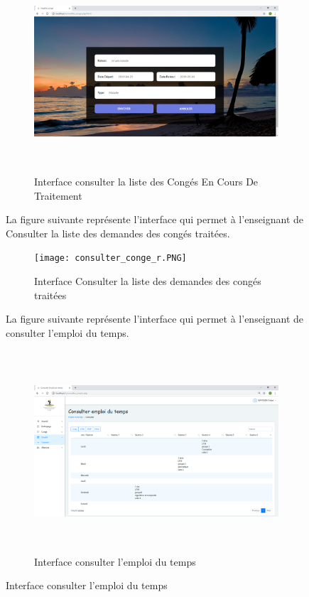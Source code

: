 \documentclass[12 pt]{report}
\begin{document}
\begin{figure}[h]
\begin{center}
\begin{figure}[h]
 \begin{center}
\includegraphics[width= 18 cm ,height=  7.5cm]{modifier_conge.PNG}
\caption{Interface consulter la liste des Congés En Cours De Traitement}

\end{center}
\end{figure}
\newpage
La figure suivante représente l'interface qui permet à l'enseignant de Consulter la liste des demandes des congés traitées.

\begin{figure}[h]
 \begin{center}
\texttt{[image: consulter\_conge\_r.PNG]}
\caption{Interface Consulter la liste des demandes des congés traitées}

\end{center}
\end{figure}

La figure suivante représente l'interface qui permet à l'enseignant de consulter l'emploi du temps.

\begin{figure}[h]
 \begin{center}
\includegraphics[width= 18 cm ,height=  7.5cm]{consulter_emploi.PNG}
\caption{Interface consulter l'emploi du temps }


\end{center}
\end{figure}
\end{center}
\end{figure}
\end{document}

